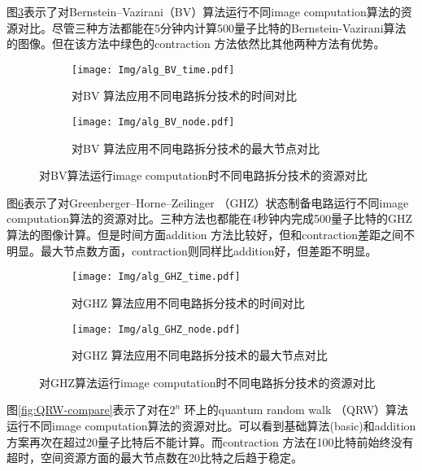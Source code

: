 图\ref{fig:BV-compare}表示了对Bernstein–Vazirani（BV）算法运行不同image computation算法的资源对比。尽管三种方法都能在5分钟内计算500量子比特的Bernstein-Vazirani算法的图像。但在该方法中绿色的contraction 方法依然比其他两种方法有优势。
\begin{figure}[!htbp]
    \centering
    \begin{subfigure}[b]{.4\textwidth}
        \centering
        \texttt{[image: Img/alg\_BV\_time.pdf]}
        \caption{对BV 算法应用不同电路拆分技术的时间对比}
        \label{fig:BV-time}
    \end{subfigure}
    \qquad
    \begin{subfigure}[b]{.4\textwidth}
        \centering
        \texttt{[image: Img/alg\_BV\_node.pdf]}
        \caption{对BV 算法应用不同电路拆分技术的最大节点对比}
        \label{fig:BV-node}
    \end{subfigure}
    \caption{对BV算法运行image computation时不同电路拆分技术的资源对比}
    \label{fig:BV-compare}
\end{figure}

图\ref{fig:GHZ-compare}表示了对Greenberger–Horne–Zeilinger （GHZ）状态制备电路运行不同image computation算法的资源对比。三种方法也都能在4秒钟内完成500量子比特的GHZ算法的图像计算。但是时间方面addition 方法比较好，但和contraction差距之间不明显。最大节点数方面，contraction则同样比addition好，但差距不明显。
\begin{figure}[!htbp]
    \centering
    \begin{subfigure}[b]{.4\textwidth}
        \centering
        \texttt{[image: Img/alg\_GHZ\_time.pdf]}
        \caption{对GHZ 算法应用不同电路拆分技术的时间对比}
        \label{fig:GHZ-time}
    \end{subfigure}
    \qquad
    \begin{subfigure}[b]{.4\textwidth}
        \centering
        \texttt{[image: Img/alg\_GHZ\_node.pdf]}
        \caption{对GHZ 算法应用不同电路拆分技术的最大节点对比}
        \label{fig:GHZ-node}
    \end{subfigure}
    \caption{对GHZ算法运行image computation时不同电路拆分技术的资源对比}
    \label{fig:GHZ-compare}
\end{figure}

图\ref{fig:QRW-compare}表示了对在$2^n$ 环上的quantum random walk （QRW）算法运行不同image computation算法的资源对比。可以看到基础算法(basic)和addition 方案再次在超过20量子比特后不能计算。而contraction 方法在100比特前始终没有超时，空间资源方面的最大节点数在20比特之后趋于稳定。

